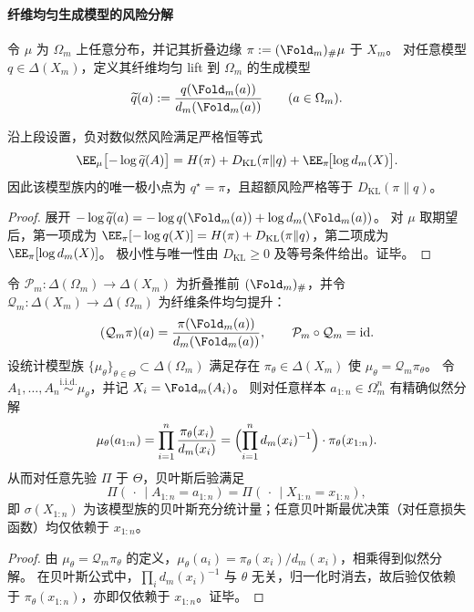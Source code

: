 \paragraph{纤维均匀生成模型的风险分解}
令 \(\mu\) 为 \(\Omega_m\) 上任意分布，并记其折叠边缘 \(\pi:= (\Fold_m)_\#\mu\) 于 \(X_m\)。
对任意模型 \(q\in\Delta(X_m)\)，定义其纤维均匀 lift 到 \(\Omega_m\) 的生成模型
\[
\widetilde q(a):=\frac{q(\Fold_m(a))}{d_m(\Fold_m(a))}\qquad(a\in\Omega_m).
\]

\begin{proposition}[负对数似然的严格账本分解]\label{prop:op-algebra-fold-uniformlift-nll-decomposition}
沿上段设置，负对数似然风险满足严格恒等式
\[
\EE_{\mu}\bigl[-\log \widetilde q(A)\bigr]
=H(\pi)+D_{\mathrm{KL}}(\pi\|q)+\EE_{\pi}\!\bigl[\log d_m(X)\bigr].
\]
因此该模型族内的唯一极小点为 \(q^\star=\pi\)，且超额风险严格等于 \(D_{\mathrm{KL}}(\pi\|q)\)。
\end{proposition}
\begin{proof}
展开
\(
-\log \widetilde q(a)=-\log q(\Fold_m(a))+\log d_m(\Fold_m(a))
\)。
对 \(\mu\) 取期望后，第一项成为 \(\EE_{\pi}[-\log q(X)]=H(\pi)+D_{\mathrm{KL}}(\pi\|q)\)，第二项成为 \(\EE_{\pi}[\log d_m(X)]\)。
极小性与唯一性由 \(D_{\mathrm{KL}}\ge 0\) 及等号条件给出。证毕。
\end{proof}

\begin{theorem}[纤维均匀模型的似然分解与贝叶斯后验塌缩]\label{thm:op-algebra-fold-bayes-posterior-collapse}
令 \(\mathcal P_m:\Delta(\Omega_m)\to\Delta(X_m)\) 为折叠推前 \((\Fold_m)_\#\)，并令 \(\mathcal Q_m:\Delta(X_m)\to\Delta(\Omega_m)\) 为纤维条件均匀提升：
\[
(\mathcal Q_m\pi)(a)=\frac{\pi(\Fold_m(a))}{d_m(\Fold_m(a))},
\qquad
\mathcal P_m\circ \mathcal Q_m=\mathrm{id}.
\]
设统计模型族 \(\{\mu_\theta\}_{\theta\in\Theta}\subset\Delta(\Omega_m)\) 满足存在 \(\pi_\theta\in\Delta(X_m)\) 使
\(
\mu_\theta=\mathcal Q_m\pi_\theta
\)。
令 \(A_1,\dots,A_n\stackrel{\mathrm{i.i.d.}}{\sim}\mu_\theta\)，并记 \(X_i=\Fold_m(A_i)\)。
则对任意样本 \(a_{1:n}\in\Omega_m^n\) 有精确似然分解
\[
\mu_\theta(a_{1:n})
=\prod_{i=1}^n \frac{\pi_\theta(x_i)}{d_m(x_i)}
=\Bigl(\prod_{i=1}^n d_m(x_i)^{-1}\Bigr)\cdot \pi_\theta(x_{1:n}).
\]
从而对任意先验 \(\Pi\) 于 \(\Theta\)，贝叶斯后验满足
\[
\Pi(\,\cdot\,\mid A_{1:n}=a_{1:n})=\Pi(\,\cdot\,\mid X_{1:n}=x_{1:n}),
\]
即 \(\sigma(X_{1:n})\) 为该模型族的贝叶斯充分统计量；任意贝叶斯最优决策（对任意损失函数）均仅依赖于 \(x_{1:n}\)。
\end{theorem}

\begin{proof}
由 \(\mu_\theta=\mathcal Q_m\pi_\theta\) 的定义，\(\mu_\theta(a_i)=\pi_\theta(x_i)/d_m(x_i)\)，相乘得到似然分解。
在贝叶斯公式中，\(\prod_i d_m(x_i)^{-1}\) 与 \(\theta\) 无关，归一化时消去，故后验仅依赖于 \(\pi_\theta(x_{1:n})\)，亦即仅依赖于 \(x_{1:n}\)。证毕。
\end{proof}

